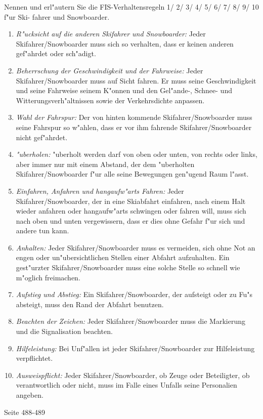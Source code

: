 \begin{question}{2}
Nennen und erl"autern Sie die FIS-Verhaltensregeln 1/ 2/ 3/ 4/ 5/ 6/ 7/ 8/ 9/ 10 f"ur Ski- fahrer und Snowboarder.
\end{question}
\begin{solution}
\begin{enumerate}
\item \emph{R"ucksicht auf die anderen Skifahrer und Snowboarder:} Jeder Skifahrer/Snowboarder muss sich so verhalten, dass er keinen anderen gef"ahrdet oder sch"adigt.
\item \emph{Beherrschung der Geschwindigkeit und der Fahrweise:} Jeder Skifahrer/Snowboarder muss auf Sicht fahren. Er muss seine Geschwindigkeit und seine Fahrweise seinem K"onnen und den Gel"ande-, Schnee- und Witterungsverh"altnissen sowie der Verkehrsdichte anpassen.
\item \emph{Wahl der Fahrspur:} Der von hinten kommende Skifahrer/Snowboarder muss seine Fahrspur so w"ahlen, dass er vor ihm fahrende Skifahrer/Snowboarder nicht gef"ahrdet.
\item \emph{"uberholen:} "uberholt werden darf von oben oder unten, von rechts oder links, aber immer nur mit einem Abstand, der dem "uberholten Skifahrer/Snowboarder f"ur alle seine Bewegungen gen"ugend Raum l"asst.
\item \emph{Einfahren, Anfahren und hangaufw"arts Fahren:} Jeder Skifahrer/Snowboarder, der in eine Skiabfahrt einfahren, nach einem Halt wieder anfahren oder hangaufw"arts schwingen oder fahren will, muss sich nach oben und unten vergewissern, dass er dies ohne Gefahr f"ur sich und andere tun kann.
\item \emph{Anhalten:} Jeder Skifahrer/Snowboarder muss es vermeiden, sich ohne Not an engen oder un"ubersichtlichen Stellen einer Abfahrt aufzuhalten. Ein gest"urzter Skifahrer/Snowboarder muss eine solche Stelle so schnell wie m"oglich freimachen.
\item \emph{Aufstieg und Abstieg:} Ein Skifahrer/Snowboarder, der aufsteigt oder zu Fu"s absteigt, muss den Rand der Abfahrt benutzen.
\item \emph{Beachten der Zeichen:} Jeder Skifahrer/Snowboarder muss die Markierung und die Signalisation beachten.
\item \emph{Hilfeleistung:} Bei Unf"allen ist jeder Skifahrer/Snowboarder zur Hilfeleistung verpflichtet.
\item \emph{Ausweispflicht:} Jeder Skifahrer/Snowboarder, ob Zeuge oder Beteiligter, ob verantwortlich oder nicht, muss im Falle eines Unfalls seine Personalien angeben.
\end{enumerate}
 Seite 488-489
\end{solution}

